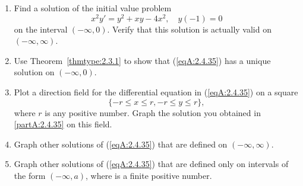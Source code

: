 \documentclass{ximera}
\begin{document}
\begin{problem}\label{exer:2.4.35}
\begin{enumerate}
\item \label{partA:2.4.35} %
Find a solution of the initial value problem
\begin{equation}\label{eqA:2.4.35}
x^2y'=y^2+xy-4x^2, \quad y(-1)=0
\end{equation}
on the interval $(-\infty,0)$. Verify that this solution is actually
valid on $(-\infty,\infty)$.
\item %
Use Theorem~\ref{thmtype:2.3.1} to show that (\ref{eqA:2.4.35}) has a unique solution on $(-\infty,0)$.
\item %
Plot a direction field for the differential equation in
(\ref{eqA:2.4.35}) on a square
$$
\{-r\leq x\leq r, -r\leq y\leq r\},
$$
where $r$
is any positive number. Graph the solution you obtained in
\ref{partA:2.4.35} on this field.
\item %
Graph  other solutions  of (\ref{eqA:2.4.35}) that are defined on $(-\infty,\infty)$.
\item %
Graph other solutions of (\ref{eqA:2.4.35})  that are defined only on intervals of
the form $(-\infty,a)$, where is a finite positive number.
\end{enumerate}
\end{problem}
\end{document}
